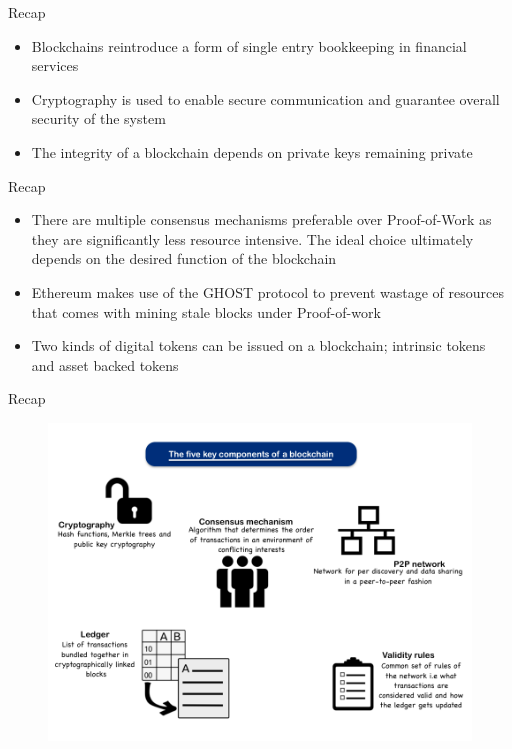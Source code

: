 \documentclass[10pt]{beamer}
\begin{document}


\begin{frame}{Recap}
	\begin{itemize}
		\item Blockchains reintroduce a form of single entry bookkeeping in financial services
		\item Cryptography is used to enable secure communication and guarantee overall security of the system
		\item The integrity of a blockchain depends on private keys remaining private
	\end{itemize}
\end{frame}


\begin{frame}{Recap}
	\begin{itemize}
		\item There are multiple consensus mechanisms preferable over Proof-of-Work as they are significantly less resource intensive. The ideal choice ultimately depends on the desired function of the blockchain
		\item Ethereum makes use of the GHOST protocol to prevent wastage of resources that comes with mining stale blocks under Proof-of-work
		\item Two kinds of digital tokens can be issued on a blockchain; intrinsic tokens and asset backed tokens
	\end{itemize}
\end{frame}


\begin{frame}{Recap}
	\begin{figure}[]
		\centering
		\includegraphics  [scale=0.3]{Images/block-key}
	\end{figure}
\end{frame}
\end{document}
